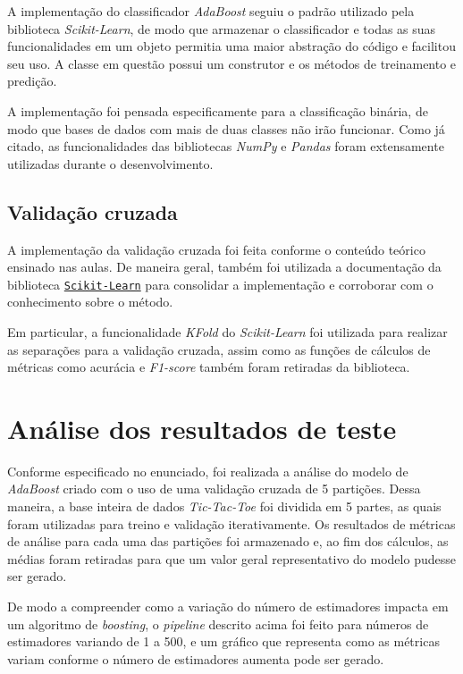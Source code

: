 \documentclass{article}
\begin{document}
A implementação do classificador \textit{AdaBoost} seguiu o padrão utilizado
pela biblioteca \textit{Scikit-Learn}, de modo que armazenar o classificador e todas
as suas funcionalidades em um objeto permitia uma maior abstração do código e
facilitou seu uso. A classe em questão possui um construtor e os métodos de
treinamento e predição.

A implementação foi pensada especificamente para a classificação binária, de
modo que bases de dados com mais de duas classes não irão funcionar. Como já
citado, as funcionalidades das bibliotecas \textit{NumPy} e \textit{Pandas}
foram extensamente utilizadas durante o desenvolvimento.

\subsection{Validação cruzada}

A implementação da validação cruzada foi feita conforme o conteúdo teórico
ensinado nas aulas. De maneira geral,
também foi utilizada a documentação da biblioteca
\href{https://scikit-learn.org/stable/modules/cross_validation.html}{\texttt{Scikit-Learn}}
para consolidar a implementação e corroborar com o conhecimento sobre o método.

Em particular, a funcionalidade \textit{KFold} do \textit{Scikit-Learn} foi
utilizada
para realizar as separações para a validação cruzada, assim como as funções de
cálculos de
métricas como acurácia e \textit{F1-score} também foram retiradas da
biblioteca.

\section{Análise dos resultados de teste}

Conforme especificado no enunciado, foi realizada a análise do modelo de
\textit{AdaBoost} criado com
o uso de uma validação cruzada de 5 partições. Dessa maneira, a base inteira de
dados \textit{Tic-Tac-Toe}
foi dividida em 5 partes, as quais foram utilizadas para treino e validação
iterativamente. Os resultados de métricas
de análise para cada uma das partições foi armazenado e, ao fim dos cálculos,
as médias foram retiradas para que um valor geral representativo
do modelo pudesse ser gerado.

De modo a compreender como a variação do número de estimadores impacta em um
algoritmo de \textit{boosting},
o \textit{pipeline} descrito acima foi feito para números de estimadores
variando de 1 a 500, e um gráfico que
representa como as métricas variam conforme o número de estimadores aumenta
pode ser gerado.
\end{document}
